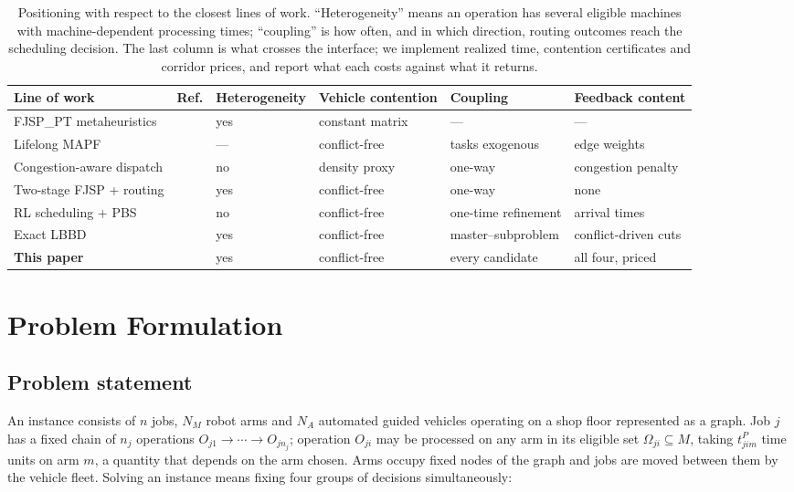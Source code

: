 \documentclass[manuscript,screen,review]{acmart}
\begin{document}
\begin{table}[t]
\caption{Positioning with respect to the closest lines of work.
``Heterogeneity'' means an operation has several eligible machines with
machine-dependent processing times; ``coupling'' is how often, and in which
direction, routing outcomes reach the scheduling decision. The last column is
what crosses the interface; we implement realized time, contention certificates
and corridor prices, and report what each costs against what it returns.}
\label{tab:related}
\footnotesize
\begin{tabular}{@{}lcllll@{}}
\toprule
Line of work & Ref. & Heterogeneity & Vehicle contention & Coupling & Feedback content \\
\midrule
FJSP\_PT metaheuristics & \cite{meng2025cp,qin2026knowledge,fu2025integrated}
  & yes & constant matrix & --- & --- \\
Lifelong MAPF & \cite{zhang2024guidance}
  & --- & conflict-free & tasks exogenous & edge weights \\
Congestion-aware dispatch & \cite{kim2026congestion}
  & no & density proxy & one-way & congestion penalty \\
Two-stage FJSP + routing & \cite{sun2023integrated}
  & yes & conflict-free & one-way & none \\
RL scheduling + PBS & \cite{li2026framework}
  & no & conflict-free & one-time refinement & arrival times \\
Exact LBBD & \cite{vanos2026exact}
  & yes & conflict-free & master--subproblem & conflict-driven cuts \\
\textbf{This paper} &
  & yes & conflict-free & every candidate & all four, priced \\
\bottomrule
\end{tabular}
\end{table}


\section{Problem Formulation}
\label{sec:Chapter_III}

\subsection{Problem statement}

An instance consists of $n$ jobs, $N_M$ robot arms and $N_A$ automated guided
vehicles operating on a shop floor represented as a graph. Job $j$ has a fixed
chain of $n_j$ operations $O_{j1}\to\cdots\to O_{jn_j}$; operation $O_{ji}$ may
be processed on any arm in its eligible set $\Omega_{ji}\subseteq M$, taking
$t^P_{jim}$ time units on arm $m$, a quantity that depends on the arm chosen.
Arms occupy fixed nodes of the graph and jobs are moved between them by the
vehicle fleet. Solving an instance means fixing four groups of decisions
simultaneously:
\end{document}
